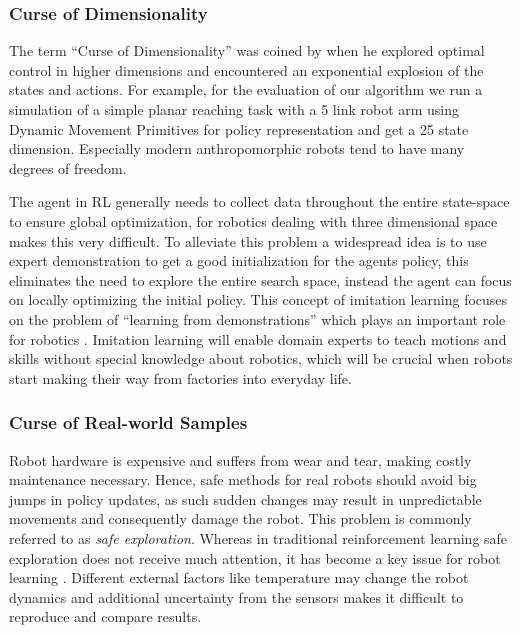 \subsubsection{Curse of Dimensionality}
The term ``Curse of Dimensionality'' was coined by \citet{Bellman:1957} when
he explored optimal control in higher dimensions and encountered
an exponential explosion of the states and actions.
For example, for the evaluation of our algorithm we run a simulation of a
simple planar reaching task
with a 5 link robot arm using Dynamic Movement Primitives \citep{ijspeert2002learning}
for policy representation and get a 25 state dimension.
Especially modern anthropomorphic robots tend to have many degrees of
freedom.

The agent in RL generally needs to collect data throughout the entire
state-space to ensure global optimization, for robotics dealing with
three dimensional space makes this very difficult.
To alleviate this problem  a widespread idea is to use expert demonstration
to get a good initialization for the agents policy, this
eliminates the need to explore the entire search space, instead the
agent can focus on locally optimizing the initial policy.
This concept of imitation learning focuses on the problem of ``learning
from demonstrations'' which plays an important role
for robotics \citep{Osaetal18}. Imitation learning
will enable domain experts to teach motions and
skills without special knowledge about robotics, which will be crucial
when robots start making their way from factories into everyday life.

\subsubsection{Curse of Real-world Samples}
Robot hardware is expensive and suffers from wear and tear, making
costly maintenance necessary. Hence, safe methods for real robots
should avoid big jumps in policy updates, as such sudden changes may
result in unpredictable movements and consequently damage the robot.
This problem is commonly referred to as \textit{safe exploration}.
Whereas in traditional reinforcement learning
safe exploration does not receive much attention,
it has become a key issue for robot learning \citep{schneider1997exploiting}.
Different external factors like temperature may change the robot dynamics and
additional uncertainty from the sensors makes it difficult to reproduce and
compare results.

